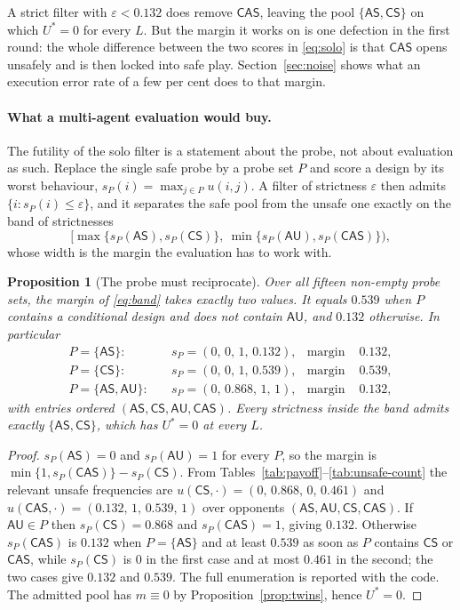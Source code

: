 \documentclass[pdflatex]{sn-jnl}
\theoremstyle{thmstyleone}
\newtheorem{proposition}[theorem]{Proposition}
\theoremstyle{thmstylethree}
\theoremstyle{thmstyletwo}
\newcommand{\AS}{\textsf{AS}}
\newcommand{\AU}{\textsf{AU}}
\newcommand{\CS}{\textsf{CS}}
\newcommand{\CAS}{\textsf{CAS}}
\begin{document}
A strict filter with $\varepsilon<0.132$ does remove $\CAS$, leaving the pool
$\{\AS,\CS\}$ on which $U^{*}=0$ for every $L$. But the margin it works on is
one defection in the first round: the whole difference between the two scores
in \eqref{eq:solo} is that $\CAS$ opens unsafely and is then locked into safe
play. Section~\ref{sec:noise} shows what an execution error rate of a few per
cent does to that margin.

\paragraph{What a multi-agent evaluation would buy.}
The futility of the solo filter is a statement about the probe, not about
evaluation as such. Replace the single safe probe by a probe set $P$ and score
a design by its worst behaviour, $s_{P}(i)=\max_{j\in P} u(i,j)$. A filter of
strictness $\varepsilon$ then admits $\{i:s_{P}(i)\le\varepsilon\}$, and it
separates the safe pool from the unsafe one exactly on the band of
strictnesses
\begin{equation}
\Big[\max\{s_{P}(\AS),s_{P}(\CS)\},\ \min\{s_{P}(\AU),s_{P}(\CAS)\}\Big),
\label{eq:band}
\end{equation}
whose width is the margin the evaluation has to work with.

\begin{proposition}[The probe must reciprocate]\label{prop:probe}
Over all fifteen non-empty probe sets, the margin of \eqref{eq:band} takes
exactly two values. It equals $0.539$ when $P$ contains a conditional design
and does not contain $\AU$, and $0.132$ otherwise. In particular
\begin{equation}
\begin{aligned}
P=\{\AS\}:&\quad s_{P}=(0,\,0,\,1,\,0.132), &\text{margin } &0.132,\\
P=\{\CS\}:&\quad s_{P}=(0,\,0,\,1,\,0.539), &\text{margin } &0.539,\\
P=\{\AS,\AU\}:&\quad s_{P}=(0,\,0.868,\,1,\,1), &\text{margin } &0.132,
\end{aligned}
\label{eq:probe}
\end{equation}
with entries ordered $(\AS,\CS,\AU,\CAS)$. Every strictness inside the band
admits exactly $\{\AS,\CS\}$, which has $U^{*}=0$ at every $L$.
\end{proposition}

\begin{proof}
$s_{P}(\AS)=0$ and $s_{P}(\AU)=1$ for every $P$, so the margin is
$\min\{1,s_{P}(\CAS)\}-s_{P}(\CS)$. From
Tables~\ref{tab:payoff}--\ref{tab:unsafe-count} the relevant unsafe
frequencies are $u(\CS,\cdot)=(0,\,0.868,\,0,\,0.461)$ and
$u(\CAS,\cdot)=(0.132,\,1,\,0.539,\,1)$ over opponents
$(\AS,\AU,\CS,\CAS)$. If $\AU\in P$ then $s_{P}(\CS)=0.868$ and
$s_{P}(\CAS)=1$, giving $0.132$. Otherwise $s_{P}(\CAS)$ is $0.132$ when
$P=\{\AS\}$ and at least $0.539$ as soon as $P$ contains $\CS$ or $\CAS$,
while $s_{P}(\CS)$ is $0$ in the first case and at most $0.461$ in the second;
the two cases give $0.132$ and $0.539$. The full enumeration is reported with
the code. The admitted pool has $m\equiv0$ by Proposition~\ref{prop:twins},
hence $U^{*}=0$.
\end{proof}
\end{document}
